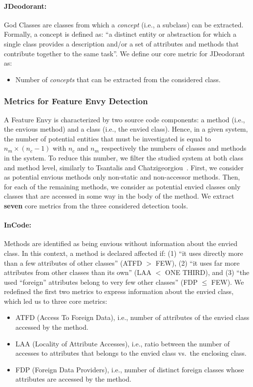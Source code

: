 \paragraph{JDeodorant:}
God Classes are classes from which a \textit{concept} (i.e., a subclass) can be extracted. Formally, a concept is defined as: ``a distinct entity or abstraction for which a single class provides a description and/or a set of attributes and methods that contribute together to the same task''. We define our core metric for JDeodorant as:
\begin{itemize}
\item  Number of \textit{concepts} that can be extracted from the considered class.
\end{itemize}

\subsubsection{Metrics for Feature Envy Detection}
\label{Paragragh: metrics feature envy}

A Feature Envy is characterized by two source code components: a method (i.e., the envious method) and a class (i.e., the envied class). Hence, in a given system, the number of potential entities that must be investigated is equal to $n_{m}\times(n_{c}-1)$ with $n_{c}$ and $n_{m}$ respectively the numbers of classes and methods in the system. To reduce this number, we filter the studied system at both class and method level, similarly to Tsantalis and Chatzigeorgiou~\cite{tsantalis2009identification}. First, we consider as potential envious methods only non-static and non-accessor methods. Then, for each of the remaining methods, we consider as potential envied classes only classes that are accessed in some way in the body of the method. We extract \textbf{seven} core metrics from the three considered detection tools.

\paragraph{InCode:}
Methods are identified as being envious without information about the envied class. In this context, a method is declared affected if: (1) ``it uses directly more than a few attributes of other classes'' (ATFD $>$ FEW), (2) ``it uses far more attributes from other classes than its own'' (LAA $<$ ONE THIRD), and (3) ``the used “foreign” attributes belong to very few other classes'' (FDP $\leq$ FEW). We redefined the first two metrics to express information about the envied class, which led us to three core metrics:
\begin{itemize}
\item ATFD (Access To Foreign Data), i.e., number of attributes of the envied class accessed by the method.
\item LAA (Locality of Attribute Accesses), i.e., ratio between the number of accesses to attributes that belongs to the envied class vs.\ the enclosing class.
\item FDP (Foreign Data Providers), i.e., number of distinct foreign classes whose attributes are accessed by the method. 
\end{itemize}

